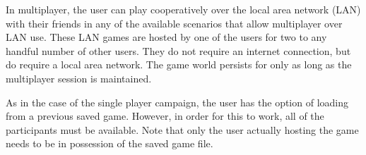 

In multiplayer, the user can play cooperatively over the local area network (LAN) with their friends in any of the available scenarios that allow multiplayer over LAN use. These LAN games are hosted by one of the users for two to any handful number of other users. They do not require an internet connection, but do require a local area network. The game world persists for only as long as the multiplayer session is maintained.

As in the case of the single player campaign, the user has the option of loading from a previous saved game. However, in order for this to work, all of the participants must be available. Note that only the user actually hosting the game needs to be in possession of the saved game file.



